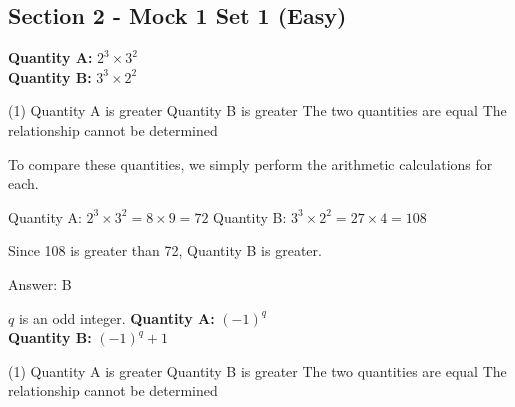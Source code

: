 \documentclass[11pt,paper=a4,answers]{exam}
\begin{document}
\begin{questions}
\pointsinrightmargin
\pointsdroppedatright
\marksnotpoints
{}
\pointformat{\boldmath\themarginpoints}
\bracketedpoints


\section*{Section 2 - Mock 1 Set 1 (Easy)}


\question
\textbf{Quantity A: } $2^3 \times 3^2$ \\
\vspace{5pt}
\textbf{Quantity B: } $3^3 \times 2^2$

\begin{tasks}(1)
\task[A)] Quantity A is greater
\task[B)] Quantity B is greater
\task[C)] The two quantities are equal
\task[D)] The relationship cannot be determined
\end{tasks}

\begin{solution}
To compare these quantities, we simply perform the arithmetic calculations for each.
\vspace{5pt}
\begin{center}
Quantity A: $2^3 \times 3^2 = 8 \times 9 = 72$
\vspace{5pt}
Quantity B: $3^3 \times 2^2 = 27 \times 4 = 108$
\end{center}
\vspace{5pt}
Since 108 is greater than 72, Quantity B is greater.

Answer: \colorbox{yellow!100}{B}
\end{solution}

\vspace{1cm}

\question
$q$ is an odd integer.
\vspace{5pt}
\textbf{Quantity A: } $(-1)^q$ \\
\vspace{5pt}
\textbf{Quantity B: } $(-1)^q + 1$

\begin{tasks}(1)
\task[A)] Quantity A is greater
\task[B)] Quantity B is greater
\task[C)] The two quantities are equal
\task[D)] The relationship cannot be determined
\end{tasks}


\end{questions}
\end{document}
